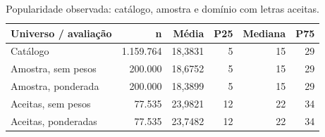 \begin{table}[htbp]
\centering\small
\caption{Popularidade observada: catálogo, amostra e domínio com letras aceitas.}
\label{tab:descritivas}
\begin{tabular}{lrrrrr}
\toprule
Universo / avaliação & n & Média & P25 & Mediana & P75 \\
\midrule
Catálogo & 1.159.764 & 18,3831 & 5 & 15 & 29 \\
Amostra, sem pesos & 200.000 & 18,6752 & 5 & 15 & 29 \\
Amostra, ponderada & 200.000 & 18,3899 & 5 & 15 & 29 \\
Aceitas, sem pesos & 77.535 & 23,9821 & 12 & 22 & 34 \\
Aceitas, ponderadas & 77.535 & 23,7482 & 12 & 22 & 34 \\
\bottomrule
\end{tabular}
\end{table}
